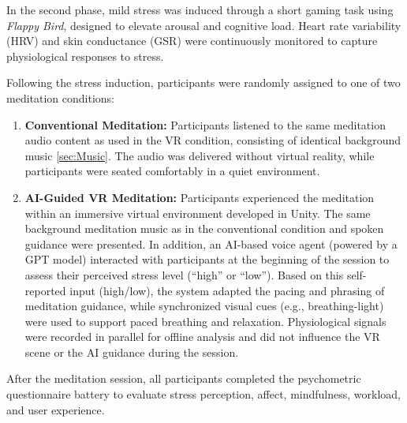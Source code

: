 In the second phase, mild stress was induced through a short gaming task using \emph{Flappy Bird}, designed to elevate arousal and cognitive load.  Heart rate variability (HRV) and skin conductance (GSR) were continuously monitored to capture physiological responses to stress.

Following the stress induction, participants were randomly assigned to one of two meditation conditions:
\begin{enumerate}[label=(\alph*)]

  \item \textbf{Conventional Meditation:}  
  Participants listened to the same meditation audio content as used in the VR condition, consisting of identical background music \ref{sec:Music}.  
  The audio was delivered without virtual reality, while participants were seated comfortably in a quiet environment.

  \item \textbf{AI-Guided VR Meditation:}  
  Participants experienced the meditation within an immersive virtual environment developed in Unity. The same background meditation music as in the conventional condition and spoken guidance were presented.  
  In addition, an AI-based voice agent (powered by a GPT model) interacted with participants at the beginning of the session to assess their perceived stress level (``high'' or ``low''). Based on this self-reported input (high/low), the system adapted the pacing and phrasing of meditation guidance, while synchronized visual cues (e.g., breathing-light) were used to support paced breathing and relaxation. Physiological signals were recorded in parallel for offline analysis and did not influence the VR scene or the AI guidance during the session.


\end{enumerate}

After the meditation session, all participants completed the psychometric questionnaire battery to evaluate stress perception, affect, mindfulness, workload, and user experience.

